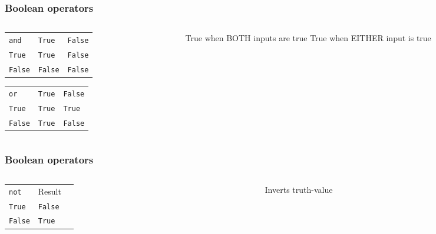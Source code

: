 \documentclass[11pt]{beamer}
\begin{document}
\begin{frame}[fragile]
  \frametitle{Boolean operators}
  \Enlarge

  \begin{columns}
  \begin{column}{0.6\textwidth}
  \begin{tabular}{lll}
  \texttt{and}   & \texttt{True}  & \texttt{False} \\
  \texttt{True}  & \texttt{True}  & \texttt{False} \\
  \texttt{False} & \texttt{False} & \texttt{False} \\
  \end{tabular}
  \newline \newline \newline
  \textcolor{CS101GradBot}{
  \begin{tabular}{lll}
  \texttt{or}    & \texttt{True}  & \texttt{False} \\
  \texttt{True}  & \texttt{True}  & \texttt{True}  \\
  \texttt{False} & \texttt{True}  & \texttt{False} \\
  \end{tabular}
  }
  \end{column}
  \begin{column}{0.4\textwidth}
    True when BOTH inputs are true
    \newline \newline \newline
    \textcolor{CS101GradBot}{
    True when EITHER input is true
    }
  \end{column}
  \end{columns}
\end{frame}

\begin{frame}[fragile]
  \frametitle{Boolean operators}
  \Enlarge

  \begin{columns}
  \begin{column}{0.6\textwidth}
  \begin{tabular}{lll}
  \texttt{not}   & Result         \\
  \texttt{True}  & \texttt{False} \\
  \texttt{False} & \texttt{True}  \\
  \end{tabular}
  \end{column}
  \begin{column}{0.4\textwidth}
    Inverts truth-value
  \end{column}
  \end{columns}
\end{frame}
\end{document}
